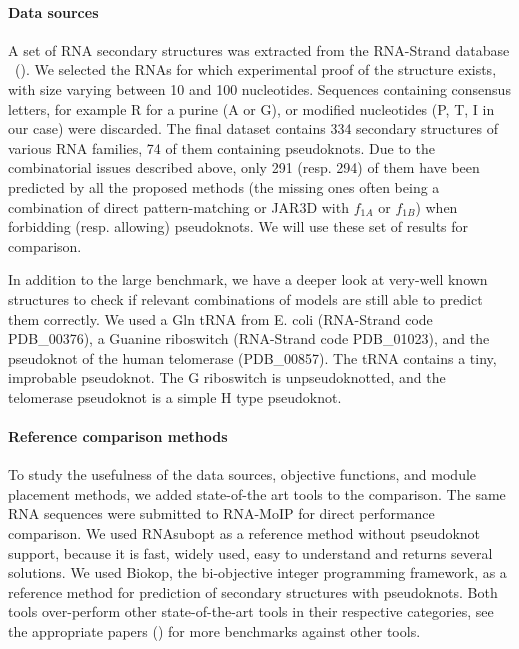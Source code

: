 \documentclass{bioinfo}
\begin{document}
\paragraph{Data sources} \label{sec:data}
A set of RNA secondary structures was extracted from the RNA-Strand database ~(\citealp{andronescu2008rna}). We selected the RNAs for which experimental proof of the structure exists, with size varying between 10 and 100 nucleotides. Sequences containing consensus letters, for example R for a purine (A or G), or modified nucleotides (P, T, I in our case) were discarded. %
The final dataset contains 334 secondary structures of various RNA families, 74 of them containing pseudoknots. Due to the combinatorial issues described above, only 291 (resp. 294) of them have been predicted by all the proposed methods (the missing ones often being a combination of direct pattern-matching or JAR3D with $f_{1A}$ or $f_{1B}$) when forbidding (resp. allowing) pseudoknots. We will use these set of results for comparison.

In addition to the large benchmark, we have a deeper look at very-well known structures to check if relevant combinations of models are still able to predict them correctly.
We used a Gln tRNA from E. coli (RNA-Strand code PDB\_00376), a Guanine riboswitch (RNA-Strand code PDB\_01023), and the pseudoknot of the human telomerase (PDB\_00857). The tRNA contains a tiny, improbable pseudoknot. The G riboswitch is unpseudoknotted, and the telomerase pseudoknot is a simple H type pseudoknot.

 
\paragraph{Reference comparison methods}
To study the usefulness of the data sources, objective functions, and module placement methods, we added state-of-the art tools to the comparison. The same RNA sequences were submitted to RNA-MoIP for direct performance comparison. We used RNAsubopt as a reference method without pseudoknot support, because it is fast, widely used, easy to understand and returns several solutions. We used Biokop, the bi-objective integer programming framework, as a reference method for prediction of secondary structures with pseudoknots. Both tools over-perform other state-of-the-art tools in their respective categories, see the appropriate papers (\citealp{lorenz2011viennarna, legendre_bi-objective_2018}) for more benchmarks against other tools.
\end{document}

